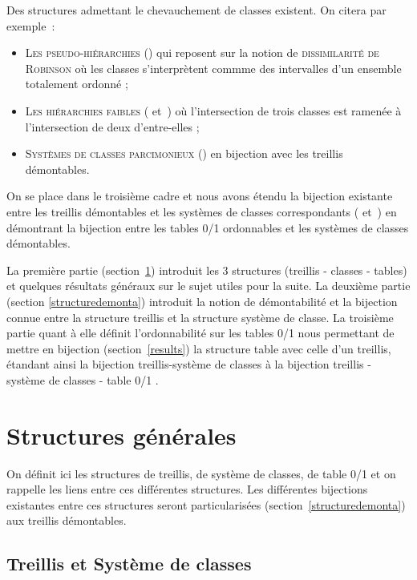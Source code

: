 \documentclass[a4paper]{report}
\begin{document}
Des structures admettant le chevauchement  de classes existent. On citera par exemple~:
\begin{itemize}
 \item \textsc{Les pseudo-hiérarchies} (\cite{dur}) qui reposent sur la notion de \textsc{dissimilarité de Robinson} où les classes s'interprètent commme
 des intervalles d'un ensemble totalement ordonné ;
\item \textsc{Les hiérarchies faibles} (\cite{dia} et~\cite{band}) où l'intersection de trois classes est ramenée à l'intersection de deux d'entre-elles ;
\item \textsc{Systèmes de classes parcimonieux} (\cite{par_clu}) en bijection avec les treillis démon\-tables.
\end{itemize}


On se place dans le troisième cadre et nous avons étendu la bijection existante entre les treillis démontables 
et les systèmes de classes correspondants (\cite{crow_free} et~\cite{par_clu}) en démontrant la bijection entre les tables 0/1
 ordonnables et les systèmes de classes démontables.

La première partie (section~\ref{gene}) introduit les 3 structures (treillis - classes - tables) et quelques résultats généraux sur le sujet utiles pour la suite.
La deuxième partie (section \ref{structuredemonta}) introduit la notion de démontabilité et la bijection connue entre la structure treillis et la structure système de classe.
La troisième  partie quant à elle définit l'ordonnabilité sur les tables 0/1 nous permettant de mettre en bijection (section~\ref{results}) la structure table avec celle d'un treillis,  
étandant ainsi la bijection treillis-système de classes à la bijection
treillis - système de classes - table 0/1 .

\chapter{Structures générales}

\label{gene}

On définit ici les structures de treillis, de système de classes, de table 0/1 et on rappelle les liens entre ces différentes structures.
Les différentes bijections existantes entre ces structures seront particularisées (section~\ref{structuredemonta}) aux treillis démontables.

\section{Treillis et Système de classes}
\end{document}
